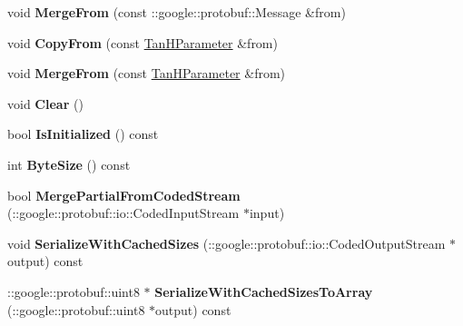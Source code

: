 \begin{DoxyCompactItemize}
void {\bfseries Merge\+From} (const \+::google\+::protobuf\+::\+Message \&from)
\item 
\mbox{\label{classcaffe_1_1_tan_h_parameter_aa37b53a4d9a9cf5ebd0cb4491378250a}} 
void {\bfseries Copy\+From} (const \mbox{\hyperlink{classcaffe_1_1_tan_h_parameter}{Tan\+H\+Parameter}} \&from)
\item 
\mbox{\label{classcaffe_1_1_tan_h_parameter_ae8e8c3cb564d4c42e629ee4e0ace3ab6}} 
void {\bfseries Merge\+From} (const \mbox{\hyperlink{classcaffe_1_1_tan_h_parameter}{Tan\+H\+Parameter}} \&from)
\item 
\mbox{\label{classcaffe_1_1_tan_h_parameter_aa5abc1607ac6fa39511d4e759ebbb826}} 
void {\bfseries Clear} ()
\item 
\mbox{\label{classcaffe_1_1_tan_h_parameter_a40812336395c065837e95634d042da77}} 
bool {\bfseries Is\+Initialized} () const
\item 
\mbox{\label{classcaffe_1_1_tan_h_parameter_ac79d5fe9b2b48cb1836034cf8ea3f9cc}} 
int {\bfseries Byte\+Size} () const
\item 
\mbox{\label{classcaffe_1_1_tan_h_parameter_afb75bf9760a1dcd7747487f42086c86d}} 
bool {\bfseries Merge\+Partial\+From\+Coded\+Stream} (\+::google\+::protobuf\+::io\+::\+Coded\+Input\+Stream $\ast$input)
\item 
\mbox{\label{classcaffe_1_1_tan_h_parameter_a77dd8db88f6d8cfd109ab6d1f748c26b}} 
void {\bfseries Serialize\+With\+Cached\+Sizes} (\+::google\+::protobuf\+::io\+::\+Coded\+Output\+Stream $\ast$output) const
\item 
\mbox{\label{classcaffe_1_1_tan_h_parameter_a07f12fee960602f0328722d3a853c640}} 
\+::google\+::protobuf\+::uint8 $\ast$ {\bfseries Serialize\+With\+Cached\+Sizes\+To\+Array} (\+::google\+::protobuf\+::uint8 $\ast$output) const
\item 
\mbox{\label{classcaffe_1_1_tan_h_parameter_a8c4cec5ba8a1e20875c0ab0c1ab48e09}} 

\end{DoxyCompactItemize}
